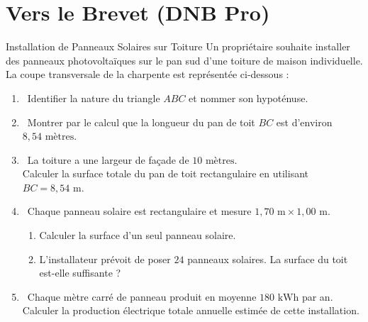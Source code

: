 \section{Vers le Brevet (DNB Pro)}

\begin{sujetdnb}{Installation de Panneaux Solaires sur Toiture}
Un propriétaire souhaite installer des panneaux photovoltaïques sur le pan sud d'une toiture de maison individuelle.
La coupe transversale de la charpente est représentée ci-dessous :

\begin{center}
\end{center}

\begin{enumerate}
    \item \capSApproprier\ Identifier la nature du triangle $ABC$ et nommer son hypoténuse.
    \item \capRealiser\ Montrer par le calcul que la longueur du pan de toit $BC$ est d'environ $8{,}54\text{ mètres}$.
    \item \capAnalyser\ La toiture a une largeur de façade de $10\text{ mètres}$.\\
    Calculer la surface totale du pan de toit rectangulaire en utilisant $BC = 8{,}54\text{ m}$.
    \item \capRealiser\ Chaque panneau solaire est rectangulaire et mesure $1{,}70\text{ m} \times 1{,}00\text{ m}$.
    \begin{enumerate}
        \item Calculer la surface d'un seul panneau solaire.
        \item L'installateur prévoit de poser $24$ panneaux solaires. La surface du toit est-elle suffisante ?
    \end{enumerate}
    \item \capValider\ Chaque mètre carré de panneau produit en moyenne $180\text{ kWh}$ par an.
    Calculer la production électrique totale annuelle estimée de cette installation.
\end{enumerate}


\end{sujetdnb}
